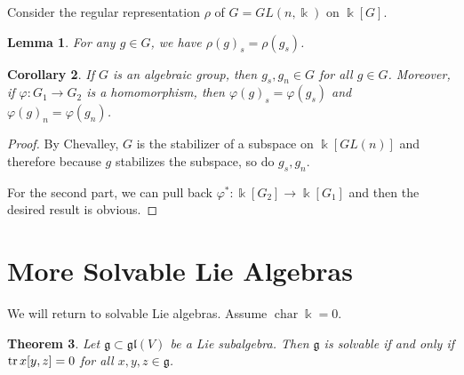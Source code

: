 \documentclass[leqno, openany]{memoir}
\newtheorem{thm}{Theorem}[section]
\newtheorem{cor}[thm]{Corollary}
\newtheorem{lem}[thm]{Lemma}
\theoremstyle{definition}
\theoremstyle{remark}
\theoremstyle{plain}
\theoremstyle{definition}
\theoremstyle{remark}
\renewcommand{\k}{\Bbbk}
\newcommand{\mf}[1]{\mathfrak{#1}}
\DeclareMathOperator{\chr}{char}
\begin{document}
Consider the regular representation $\rho$ of $G = GL(n, \k)$ on $\k[G]$.

\begin{lem} For any $g \in G$, we have ${\rho(g)}_s = \rho(g_s)$.  \end{lem}

\begin{cor} If $G$ is an algebraic group, then $g_s, g_n \in G$ for all $g \in
G$. Moreover, if $\varphi \colon G_1 \to G_2$ is a homomorphism, then ${
\varphi(g) }_s = \varphi(g_s)$ and ${\varphi(g)}_n = \varphi(g_n)$.  \end{cor}

\begin{proof} By Chevalley, $G$ is the stabilizer of a subspace on $\k[GL(n)]$
    and therefore because $g$ stabilizes the subspace, so do $g_s, g_n$.

    For the second part, we can pull back $\varphi^* \colon \k[G_2] \to
\k[G_1]$ and then the desired result is obvious.  \end{proof}

\section{More Solvable Lie Algebras}%

We will return to solvable Lie algebras. Assume $\chr \k = 0$.

\begin{thm} Let $\mf{g} \subset \mf{gl}(V)$ be a Lie subalgebra. Then $\mf{g}$
is solvable if and only if $\trace x[y,z] = 0$ for all $x,y,z \in \mf{g}$.
\end{thm}
\end{document}
